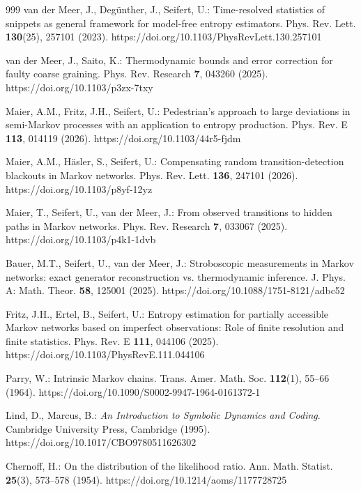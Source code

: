 \begin{thebibliography}{999}
van der Meer, J., Deg\"unther, J., Seifert, U.: Time-resolved statistics of snippets as general framework for model-free entropy estimators. Phys. Rev. Lett. \textbf{130}(25), 257101 (2023). https://doi.org/10.1103/PhysRevLett.130.257101

van der Meer, J., Saito, K.: Thermodynamic bounds and error correction for faulty coarse graining. Phys. Rev. Research \textbf{7}, 043260 (2025). https://doi.org/10.1103/p3zx-7txy

Maier, A.M., Fritz, J.H., Seifert, U.: Pedestrian's approach to large deviations in semi-Markov processes with an application to entropy production. Phys. Rev. E \textbf{113}, 014119 (2026). https://doi.org/10.1103/44r5-fjdm

Maier, A.M., H\"asler, S., Seifert, U.: Compensating random transition-detection blackouts in Markov networks. Phys. Rev. Lett. \textbf{136}, 247101 (2026). https://doi.org/10.1103/p8yf-12yz

Maier, T., Seifert, U., van der Meer, J.: From observed transitions to hidden paths in Markov networks. Phys. Rev. Research \textbf{7}, 033067 (2025). https://doi.org/10.1103/p4k1-1dvb

Bauer, M.T., Seifert, U., van der Meer, J.: Stroboscopic measurements in Markov networks: exact generator reconstruction vs. thermodynamic inference. J. Phys. A: Math. Theor. \textbf{58}, 125001 (2025). https://doi.org/10.1088/1751-8121/adbc52

Fritz, J.H., Ertel, B., Seifert, U.: Entropy estimation for partially
accessible Markov networks based on imperfect observations: Role of finite
resolution and finite statistics. Phys. Rev. E \textbf{111}, 044106 (2025).
https://doi.org/10.1103/PhysRevE.111.044106

Parry, W.: Intrinsic Markov chains. Trans. Amer. Math. Soc. \textbf{112}(1),
55--66 (1964). https://doi.org/10.1090/S0002-9947-1964-0161372-1

Lind, D., Marcus, B.: \emph{An Introduction to Symbolic Dynamics and Coding}.
Cambridge University Press, Cambridge (1995).
https://doi.org/10.1017/CBO9780511626302

Chernoff, H.: On the distribution of the likelihood ratio. Ann. Math. Statist. \textbf{25}(3), 573--578 (1954). https://doi.org/10.1214/aoms/1177728725


\end{thebibliography}
